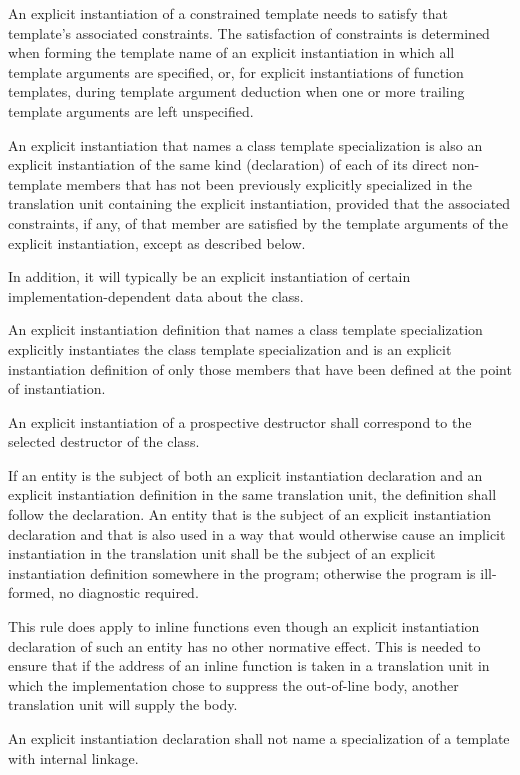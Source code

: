 \pnum
\begin{note}
An explicit instantiation of a constrained template needs
to satisfy that template's associated constraints.
The satisfaction of constraints is determined
when forming the template name of an explicit instantiation
in which all template arguments are specified,
or, for explicit instantiations of function templates,
during template argument deduction
when one or more trailing template arguments are left unspecified.
\end{note}

\pnum
An explicit instantiation that names a class
template specialization is also an explicit
instantiation of the same kind (declaration) of each
of its direct non-template members
that has not been previously explicitly specialized in
the translation unit containing the explicit instantiation,
provided that the associated constraints, if any,
of that member are satisfied by the template arguments of the explicit
instantiation,
except as described below.
\begin{note}
In addition, it will typically be an explicit instantiation of certain
%
implementation-dependent data about the class.
\end{note}

\pnum
An explicit instantiation definition that names a class template
specialization explicitly instantiates the class template specialization
and is an explicit instantiation definition of only those
members that have been defined at the point of instantiation.

\pnum
An explicit instantiation of a prospective destructor
shall correspond to the selected destructor of the class.

\pnum
If an entity is the subject of both an explicit instantiation declaration
and an explicit instantiation definition in the same translation unit, the
definition shall follow the declaration. An entity that is the subject of an
explicit instantiation declaration and that is also used
in a way that would otherwise cause an implicit instantiation
in the translation unit
shall be the subject of an explicit instantiation definition somewhere in the
program; otherwise the program is ill-formed, no diagnostic required.
\begin{note}
This rule does apply to inline functions even though an
explicit instantiation declaration of such an entity has no other normative
effect. This is needed to ensure that if the address of an inline function is
taken in a translation unit in which the implementation chose to suppress the
out-of-line body, another translation unit will supply the body.
\end{note}
An explicit instantiation declaration shall not name a specialization of a
template with internal linkage.

